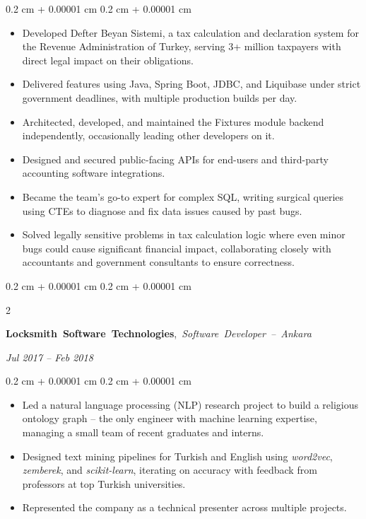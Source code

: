 \documentclass[10pt, letterpaper]{article}
\newenvironment{highlights}{
    \begin{itemize}[
        topsep=0.10 cm,
        parsep=0.10 cm,
        partopsep=0pt,
        itemsep=0pt,
        leftmargin=0.4 cm + 10pt
    ]
}{
    \end{itemize}
} %
\newenvironment{onecolentry}{
    \begin{adjustwidth}{
        0.2 cm + 0.00001 cm
    }{
        0.2 cm + 0.00001 cm
    }
}{
    \end{adjustwidth}
} %
\newenvironment{twocolentry}[2][]{
    \onecolentry
    \def\secondColumn{#2}
    \setcolumnwidth{\fill, 4.5 cm}
    \begin{paracol}{2}
}{
    \switchcolumn \raggedleft \secondColumn
    \end{paracol}
    \endonecolentry
} %
\begin{document}
        \vspace{0.10 cm}
        \begin{onecolentry}
            \begin{highlights}
            \item Developed Defter Beyan Sistemi, a tax calculation and declaration system for the Revenue Administration of Turkey, serving 3+ million taxpayers with direct legal impact on their obligations.
            \item Delivered features using Java, Spring Boot, JDBC, and Liquibase under strict government deadlines, with multiple production builds per day.
\item Architected, developed, and maintained the Fixtures module backend independently, occasionally leading other developers on it.
\item Designed and secured public-facing APIs for end-users and third-party accounting software integrations.
\item Became the team's go-to expert for complex SQL, writing surgical queries using CTEs to diagnose and fix data issues caused by past bugs.
\item Solved legally sensitive problems in tax calculation logic where even minor bugs could cause significant financial impact, collaborating closely with accountants and government consultants to ensure correctness.
            \end{highlights}
        \end{onecolentry}

        \vspace{0.35 cm}

        \begin{twocolentry}{
        \textit{Jul 2017 – Feb 2018}}
            \mbox{\textbf{Locksmith Software Technologies},
            \textit{Software Developer -- Ankara}
            }
        \end{twocolentry}

        \vspace{0.10 cm}
        \begin{onecolentry}
            \begin{highlights}
            \item Led a natural language processing (NLP) research project to build a religious ontology graph -- the only engineer with machine learning expertise, managing a small team of recent graduates and interns.
            \item Designed text mining pipelines for Turkish and English using \textit{word2vec}, \textit{zemberek}, and \textit{scikit-learn}, iterating on accuracy with feedback from professors at top Turkish universities.
\item Represented the company as a technical presenter across multiple projects.
            \end{highlights}
        \end{onecolentry}
\end{document}
